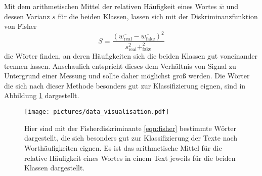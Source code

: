 Mit dem arithmetischen Mittel der relativen Häufigkeit eines Wortes $\overline{w}$
und dessen Varianz $s$ für die beiden Klassen, lassen sich mit der Diskriminanzfunktion von Fisher 
\begin{equation}
    \label{eqn:fisher}
    S = \frac{(\overline{w_{\text{real}}} - \overline{w_{\text{fake}}})^2}{s_{\text{real}}^2+_{\text{fake}}^2}
\end{equation}
die Wörter finden, an deren Häufigkeiten sich die beiden Klassen gut voneinander trennen
lassen. Anschaulich entspricht dieses dem Verhältnis von Signal zu Untergrund einer Messung und sollte
daher möglichst groß werden. Die Wörter die sich nach dieser Methode besonders gut zur Klassifizierung
eignen, sind in Abbildung \ref{fig:fisher_hist} dargestellt.

\begin{figure}
    \centering
    \texttt{[image: pictures/data\_visualisation.pdf]}
    \caption{Hier sind mit der Fisherdiskriminante \eqref{eqn:fisher} bestimmte
    Wörter dargestellt, die sich besonders gut zur Klassifizierung der Texte nach 
    Worthäufigkeiten eignen. Es ist das arithmetische Mittel für die relative Häufigkeit
    eines Wortes in einem Text jeweils für die beiden Klassen dargestellt. }
    \label{fig:fisher_hist}
\end{figure}